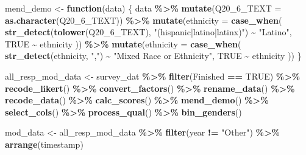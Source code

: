\documentclass[12pt,twoside]{reedthesis}
\newenvironment{Shaded}{\begin{snugshade}}{\end{snugshade}}
\newcommand{\ControlFlowTok}[1]{\textcolor[rgb]{0.13,0.29,0.53}{\textbf{#1}}}
\newcommand{\DataTypeTok}[1]{\textcolor[rgb]{0.13,0.29,0.53}{#1}}
\newcommand{\DecValTok}[1]{\textcolor[rgb]{0.00,0.00,0.81}{#1}}
\newcommand{\KeywordTok}[1]{\textcolor[rgb]{0.13,0.29,0.53}{\textbf{#1}}}
\newcommand{\NormalTok}[1]{#1}
\newcommand{\OperatorTok}[1]{\textcolor[rgb]{0.81,0.36,0.00}{\textbf{#1}}}
\newcommand{\OtherTok}[1]{\textcolor[rgb]{0.56,0.35,0.01}{#1}}
\newcommand{\StringTok}[1]{\textcolor[rgb]{0.31,0.60,0.02}{#1}}
\begin{document}
\begin{Shaded}
\begin{Highlighting}[]
\NormalTok{mend\_demo \textless{}{-}}\StringTok{ }\ControlFlowTok{function}\NormalTok{(data) \{}
\NormalTok{  data }\OperatorTok{\%\textgreater{}\%}
\StringTok{    }\KeywordTok{mutate}\NormalTok{(}\DataTypeTok{Q20\_6\_TEXT =} \KeywordTok{as.character}\NormalTok{(Q20\_}\DecValTok{6}\NormalTok{\_TEXT)) }\OperatorTok{\%\textgreater{}\%}
\StringTok{    }\KeywordTok{mutate}\NormalTok{(}\DataTypeTok{ethnicity =} \KeywordTok{case\_when}\NormalTok{(}
      \KeywordTok{str\_detect}\NormalTok{(}\KeywordTok{tolower}\NormalTok{(Q20\_}\DecValTok{6}\NormalTok{\_TEXT), }\StringTok{"(hispanic|latino|latinx)"}\NormalTok{) }\OperatorTok{\textasciitilde{}}\StringTok{ "Latino"}\NormalTok{,}
      \OtherTok{TRUE} \OperatorTok{\textasciitilde{}}\StringTok{ }\NormalTok{ethnicity}
\NormalTok{    )) }\OperatorTok{\%\textgreater{}\%}
\StringTok{    }\KeywordTok{mutate}\NormalTok{(}\DataTypeTok{ethnicity =} \KeywordTok{case\_when}\NormalTok{(}
      \KeywordTok{str\_detect}\NormalTok{(ethnicity, }\StringTok{","}\NormalTok{) }\OperatorTok{\textasciitilde{}}\StringTok{ "Mixed Race or Ethnicity"}\NormalTok{,}
      \OtherTok{TRUE} \OperatorTok{\textasciitilde{}}\StringTok{ }\NormalTok{ethnicity}
\NormalTok{    ))}
\NormalTok{\}}

\NormalTok{all\_resp\_mod\_data \textless{}{-}}\StringTok{ }\NormalTok{survey\_dat }\OperatorTok{\%\textgreater{}\%}
\StringTok{  }\KeywordTok{filter}\NormalTok{(Finished }\OperatorTok{==}\StringTok{ }\OtherTok{TRUE}\NormalTok{) }\OperatorTok{\%\textgreater{}\%}
\StringTok{  }\KeywordTok{recode\_likert}\NormalTok{() }\OperatorTok{\%\textgreater{}\%}
\StringTok{  }\KeywordTok{convert\_factors}\NormalTok{() }\OperatorTok{\%\textgreater{}\%}
\StringTok{  }\KeywordTok{rename\_data}\NormalTok{() }\OperatorTok{\%\textgreater{}\%}
\StringTok{  }\KeywordTok{recode\_data}\NormalTok{() }\OperatorTok{\%\textgreater{}\%}
\StringTok{  }\KeywordTok{calc\_scores}\NormalTok{() }\OperatorTok{\%\textgreater{}\%}
\StringTok{  }\KeywordTok{mend\_demo}\NormalTok{()  }\OperatorTok{\%\textgreater{}\%}
\StringTok{  }\KeywordTok{select\_cols}\NormalTok{() }\OperatorTok{\%\textgreater{}\%}
\StringTok{  }\KeywordTok{process\_qual}\NormalTok{() }\OperatorTok{\%\textgreater{}\%}
\StringTok{  }\KeywordTok{bin\_genders}\NormalTok{()}

\NormalTok{mod\_data \textless{}{-}}\StringTok{ }\NormalTok{all\_resp\_mod\_data }\OperatorTok{\%\textgreater{}\%}
\StringTok{  }\KeywordTok{filter}\NormalTok{(year }\OperatorTok{!=}\StringTok{ "Other"}\NormalTok{) }\OperatorTok{\%\textgreater{}\%}
\StringTok{  }\KeywordTok{arrange}\NormalTok{(timestamp)}


\end{Highlighting}
\end{Shaded}
\end{document}
